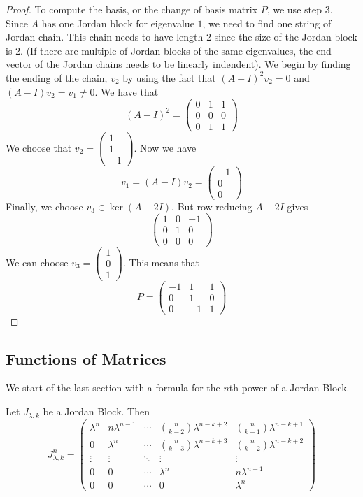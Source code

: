 \documentclass[a4paper]{article}
\begin{document}
\begin{eg}{}{}
\begin{proof}
To compute the basis, or the change of basis matrix $P$, we use step $3$. Since $A$ has one Jordan block for eigenvalue $1$, we need to find one string of Jordan chain. This chain needs to have length $2$ since the size of the Jordan block is $2$. (If there are multiple of Jordan blocks of the same eigenvalues, the end vector of the Jordan chains needs to be linearly indendent). We begin by finding the ending of the chain, $v_2$ by using the fact that $(A-I)^2v_2=0$ and $(A-I)v_2=v_1\neq 0$. We have that $$(A-I)^2=\begin{pmatrix}
0 & 1 & 1\\
0 & 0 & 0\\
0 & 1 & 1
\end{pmatrix}$$
We choose that $v_2=\begin{pmatrix}1\\ 1\\ -1\end{pmatrix}$. Now we have $$v_1=(A-I)v_2=\begin{pmatrix}-1\\ 0\\ 0 \end{pmatrix}$$ Finally, we choose $v_3\in\ker(A-2I)$. But row reducing $A-2I$ gives $$\begin{pmatrix}
1 & 0 & -1\\
0 & 1 & 0\\
0 & 0 & 0
\end{pmatrix}$$
We can choose $v_3=\begin{pmatrix}1\\ 0\\ 1\end{pmatrix}$. This means that $$P=\begin{pmatrix}
-1 & 1 & 1\\
0 & 1 & 0\\
0 & -1 & 1
\end{pmatrix}$$
\end{proof}
\end{eg}

\subsection{Functions of Matrices}
We start of the last section with a formula for the $n$th power of a Jordan Block. 
\begin{lmm}{}{} Let $J_{\lambda,k}$ be a Jordan Block. Then $$J_{\lambda,k}^n=\begin{pmatrix}
\lambda^n & n\lambda^{n-1} & \cdots & \binom{n}{k-2}\lambda^{n-k+2} & \binom{n}{k-1}\lambda^{n-k+1}\\
0 & \lambda^n & \cdots & \binom{n}{k-3}\lambda^{n-k+3} & \binom{n}{k-2}\lambda^{n-k+2}\\
\vdots & \vdots & \ddots & \vdots & \vdots\\
0 & 0 & \cdots & \lambda^n & n\lambda^{n-1}\\
0 & 0 & \cdots & 0 & \lambda^n
\end{pmatrix}$$
\end{lmm}
\end{document}
